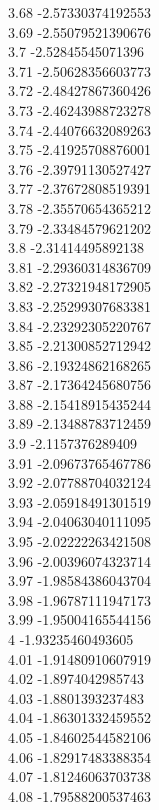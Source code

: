 {3.68	-2.57330374192553\\
3.69	-2.55079521390676\\
3.7	-2.52845545071396\\
3.71	-2.50628356603773\\
3.72	-2.48427867360426\\
3.73	-2.46243988723278\\
3.74	-2.44076632089263\\
3.75	-2.41925708876001\\
3.76	-2.39791130527427\\
3.77	-2.37672808519391\\
3.78	-2.35570654365212\\
3.79	-2.33484579621202\\
3.8	-2.31414495892138\\
3.81	-2.29360314836709\\
3.82	-2.27321948172905\\
3.83	-2.25299307683381\\
3.84	-2.23292305220767\\
3.85	-2.21300852712942\\
3.86	-2.19324862168265\\
3.87	-2.17364245680756\\
3.88	-2.15418915435244\\
3.89	-2.13488783712459\\
3.9	-2.1157376289409\\
3.91	-2.09673765467786\\
3.92	-2.07788704032124\\
3.93	-2.05918491301519\\
3.94	-2.04063040111095\\
3.95	-2.02222263421508\\
3.96	-2.00396074323714\\
3.97	-1.98584386043704\\
3.98	-1.96787111947173\\
3.99	-1.95004165544156\\
4	-1.93235460493605\\
4.01	-1.91480910607919\\
4.02	-1.8974042985743\\
4.03	-1.8801393237483\\
4.04	-1.86301332459552\\
4.05	-1.84602544582106\\
4.06	-1.82917483388354\\
4.07	-1.81246063703738\\
4.08	-1.79588200537463\\
}
